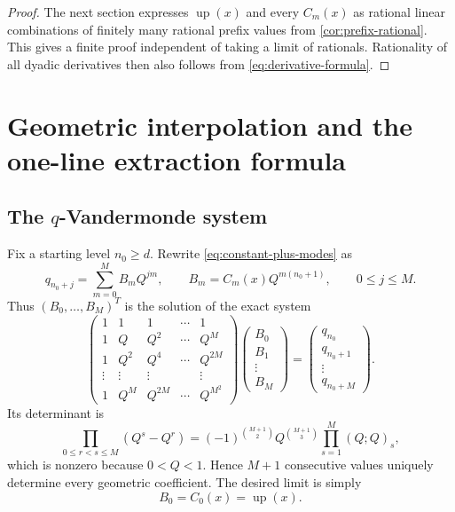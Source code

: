 \documentclass[11pt]{article}
\newcommand{\upf}{\operatorname{up}}
\begin{document}
\begin{proof}
The next section expresses \(\upf(x)\) and every \(C_m(x)\) as rational linear
combinations of finitely many rational prefix values from
\cref{cor:prefix-rational}.  This gives a finite proof independent of taking a
limit of rationals.  Rationality of all dyadic derivatives then also follows
from \cref{eq:derivative-formula}.
\end{proof}

\section{Geometric interpolation and the one-line extraction formula}

\subsection{The \(q\)-Vandermonde system}

Fix a starting level \(n_0\ge d\).  Rewrite \cref{eq:constant-plus-modes} as
\begin{equation}\label{eq:scaled-coefficients}
 q_{n_0+j}=\sum_{m=0}^{M}B_m Q^{jm},
 \qquad
 B_m=C_m(x)Q^{m(n_0+1)},
 \qquad 0\le j\le M.
\end{equation}
Thus \((B_0,\ldots,B_M)^T\) is the solution of the exact system
\begin{equation}\label{eq:q-vandermonde-system}
 \begin{pmatrix}
 1&1&1&\cdots&1\\
 1&Q&Q^2&\cdots&Q^M\\
 1&Q^2&Q^4&\cdots&Q^{2M}\\
 \vdots&\vdots&\vdots&&\vdots\\
 1&Q^M&Q^{2M}&\cdots&Q^{M^2}
 \end{pmatrix}
 \begin{pmatrix}B_0\\B_1\\\vdots\\B_M\end{pmatrix}
 =
 \begin{pmatrix}q_{n_0}\\q_{n_0+1}\\\vdots\\q_{n_0+M}\end{pmatrix}.
\end{equation}
Its determinant is
\begin{equation}\label{eq:q-vandermonde-det}
 \prod_{0\le r<s\le M}(Q^s-Q^r)
 =(-1)^{\binom{M+1}{2}}Q^{\binom{M+1}{3}}
  \prod_{s=1}^{M}(Q;Q)_s,
\end{equation}
which is nonzero because \(0<Q<1\).  Hence \(M+1\) consecutive values uniquely
determine every geometric coefficient.  The desired limit is simply
\[
 B_0=C_0(x)=\upf(x).
\]
\end{document}
